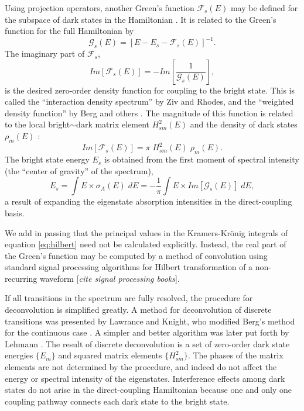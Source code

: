 \documentclass[12pt]{mitthesis}
\begin{document}
Using projection operators, another Green's function
$\mathcal{F}_s(E)$ may be defined for the subspace of dark states in
the Hamiltonian \cite{ziv76, cable80}.  It is related to the Green's
function for the full Hamiltonian by
\begin{equation}
  \label{eq:green-subspace}
  \mathcal{G}_s(E) = [E - E_s - \mathcal{F}_s(E)]^{-1}.
\end{equation}
The imaginary part of $\mathcal{F}_s$,
\begin{equation}
  \label{eq:idf}
  Im[\mathcal{F}_s(E)] = - Im \left [
    \frac{1}{\mathcal{G}_s(E)}
  \right ], 
\end{equation}
is the desired zero-order density function for coupling to the bright
state.  This is called the ``interaction density spectrum'' by Ziv and
Rhodes, and the ``weighted density function'' by Berg and others
\cite{ziv76, berg76}.  The magnitude of this function is related to
the local bright$\sim$dark matrix element $H_{sm}^2(E)$ and the
density of dark states $\rho_m(E)$ \cite{berg76}:
\begin{equation}
  Im[\mathcal{F}_s(E)] = \pi \; H_{sm}^2(E) \; \rho_m(E).
\end{equation}
The bright state energy $E_s$ is obtained from the first moment of
spectral intensity (the ``center of gravity'' of the spectrum),
\begin{equation}
  \label{eq:bse-continuous}
  E_s = \int E \times \sigma_A (E) \; dE
  = - \frac{1}{\pi} \int E \times Im[\mathcal{G}_s(E)] \; dE,
\end{equation}
a result of expanding the eigenstate absorption intensities in the
direct-coupling basis.

We add in passing that the principal values in the Kramers-Kr\"{o}nig
integrals of equation \ref{eq:hilbert} need not be calculated
explicitly.  Instead, the real part of the Green's function may be
computed by a method of convolution using standard signal processing
algorithms for Hilbert transformation of a non-recurring waveform
[\emph{cite signal processing books}].

If all transitions in the spectrum are fully resolved, the procedure
for deconvolution is simplified greatly.  A method for deconvolution
of discrete transitions was presented by Lawrance and Knight, who
modified Berg's method for the continuous case \cite{lawrance85,
  berg76}.  A simpler and better algorithm was later put forth by
Lehmann \cite{lehmann91}.  The result of discrete deconvolution is a
set of zero-order dark state energies $\lbrace E_m \rbrace$ and
squared matrix elements $\lbrace H_{sm}^2 \rbrace$.  The phases of the
matrix elements are not determined by the procedure, and indeed do not
affect the energy or spectral intensity of the eigenstates.
Interference effects among dark states do not arise in the
direct-coupling Hamiltonian because one and only one coupling pathway
connects each dark state to the bright state.
\end{document}

